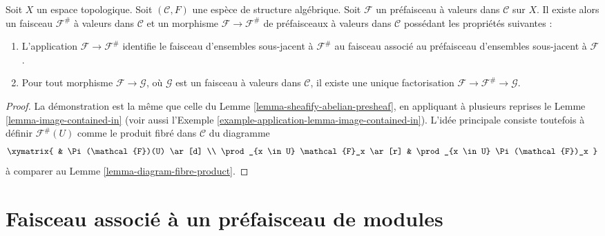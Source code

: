 \begin{lemma}
\label{lemma-sheafify-presheaf-structures}
Soit $X$ un espace topologique.
Soit $(\mathcal{C}, F)$ une espèce de structure algébrique.
Soit $\mathcal{F}$ un préfaisceau à valeurs dans $\mathcal{C}$
sur $X$. Il existe alors un faisceau $\mathcal{F}^\#$ à valeurs
dans $\mathcal{C}$ et un morphisme $\mathcal{F} \to \mathcal{F}^\#$
de préfaisceaux à valeurs dans $\mathcal{C}$ possédant les
propriétés suivantes :
\begin{enumerate}
\item L'application $\mathcal{F} \to \mathcal{F}^\#$ identifie
le faisceau d'ensembles sous-jacent à $\mathcal{F}^\#$ au
faisceau associé au préfaisceau d'ensembles sous-jacent à $\mathcal{F}$.
\item Pour tout morphisme $\mathcal{F} \to \mathcal{G}$, où
$\mathcal{G}$ est un faisceau à valeurs dans $\mathcal{C}$, il existe
une unique factorisation $\mathcal{F} \to \mathcal{F}^\# \to \mathcal{G}$.
\end{enumerate}
\end{lemma}

\begin{proof}
La démonstration est la même que celle du
Lemme \ref{lemma-sheafify-abelian-presheaf},
en appliquant à plusieurs reprises le
Lemme \ref{lemma-image-contained-in} (voir aussi
l'Exemple \ref{example-application-lemma-image-contained-in}).
L'idée principale consiste toutefois à définir $\mathcal{F}^\#(U)$
comme le produit fibré dans $\mathcal{C}$ du diagramme
$$
\xymatrix{
 &
\Pi(\mathcal{F})(U) \ar[d] \\
\prod_{x \in U} \mathcal{F}_x
\ar[r] &
\prod_{x \in U} \Pi(\mathcal{F})_x
}
$$
à comparer au Lemme \ref{lemma-diagram-fibre-product}.
\end{proof}

\section{Faisceau associé à un préfaisceau de modules}
\label{section-sheafification-presheaves-modules}

